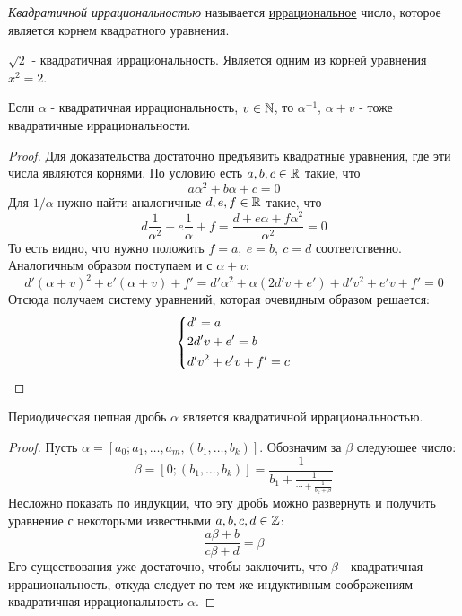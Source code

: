 \begin{definition}
	\textit{Квадратичной иррациональностью} называется \underline{иррациональное} число, которое является корнем квадратного уравнения.
\end{definition}

\begin{example}
	$\sqrt{2}$ - квадратичная иррациональность. Является одним из корней уравнения $x^2 = 2$.
\end{example}

\begin{proposition}
	Если $\alpha$ - квадратичная иррациональность, $v \in \mathbb{N}$, то $\alpha^{-1}$, $\alpha + v$ - тоже квадратичные иррациональности.
\end{proposition}

\begin{proof}
	Для доказательства достаточно предъявить квадратные уравнения, где эти числа являются корнями. По условию есть $a, b, c \in \mathbb{R}$ такие, что
	\[
		a\alpha^2 + b\alpha + c = 0
	\]
	Для $1/\alpha$ нужно найти аналогичные $d, e, f \in \mathbb{R}$ такие, что
	\[
		d\frac{1}{\alpha^2} + e\frac{1}{\alpha} + f = \frac{d + e\alpha + f\alpha^2}{\alpha^2} = 0
	\]
	То есть видно, что нужно положить $f = a,\ e = b,\ c = d$ соответственно. Аналогичным образом поступаем и с $\alpha + v$:
	\[
		d'(\alpha + v)^2 + e'(\alpha + v) + f' = d'\alpha^2 + \alpha(2d'v + e') + d'v^2 + e'v + f' = 0 
	\]
	Отсюда получаем систему уравнений, которая очевидным образом решается:
	\[
		\left\{\begin{aligned}
			&{d' = a}
			\\
			&{2d'v + e' = b}
			\\
			&{d'v^2 + e'v + f' = c}
		\end{aligned}\right.
	\]
\end{proof}

\begin{proposition}
	Периодическая цепная дробь $\alpha$ является квадратичной иррациональностью.
\end{proposition}

\begin{proof}
	Пусть $\alpha = [a_0; a_1, \ldots, a_m, (b_1, \ldots, b_k)]$. Обозначим за $\beta$ следующее число:
	\[
		\beta = [0; (b_1, \ldots, b_k)] = \frac{1}{b_1 + \frac{1}{\cdots + \frac{1}{b_k + \beta}}}
	\]
	Несложно показать по индукции, что эту дробь можно развернуть и получить уравнение с некоторыми известными $a, b, c, d \in \mathbb{Z}$:
	\[
		\frac{a\beta + b}{c\beta + d} = \beta
	\]
	Его существования уже достаточно, чтобы заключить, что $\beta$ - квадратичная иррациональность, откуда следует по тем же индуктивным соображениям квадратичная иррациональность $\alpha$.
\end{proof}

